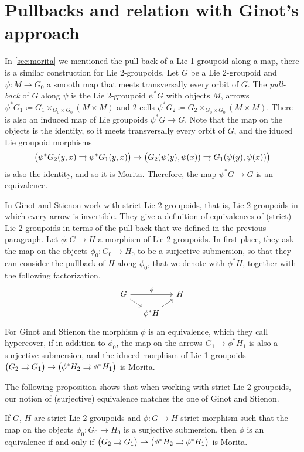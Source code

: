 %
%

\section{Pullbacks and relation with Ginot's approach}

In \textsection \ref{sec:morita} we mentioned the pull-back of a Lie 1-groupoid along a map, there is a similar construction for Lie 2-groupoids.
Let $G$ be a Lie 2-groupoid and $\psi\colon M\to G_0$ a smooth map that meets transversally every orbit of $G$.
The \emph{pull-back} of $G$ along $\psi$ is the Lie 2-groupoid $\psi^*G$ with objects $M$, arrows $\psi^*G_1 \coloneqq G_1\times_{G_0\times G_0}(M\times M)$ and 2-cells $\psi^*G_2 \coloneqq G_2\times_{G_0\times G_0}(M\times M)$.
There is also an induced map of Lie groupoids $\psi^*G\to G$.
Note that the map on the objects is the identity, so it meets transversally every orbit of $G$, and the iduced Lie groupoid morphisms
\[ \big( \psi^*G_2(y,x) \rightrightarrows \psi^*G_1(y,x) \big) \to \big( G_2(\psi(y),\psi(x)) \rightrightarrows G_1(\psi(y),\psi(x)) \big) \]
is also the identity, and so it is Morita.
Therefore, the map $\psi^*G\to G$ is an equivalence.

In \cite{gs15} Ginot and Stienon work with strict Lie 2-groupoids, that is, Lie 2-groupoids in which every arrow is invertible.
They give a definition of equivalences of (strict) Lie 2-groupoids in terms of the pull-back that we defined in the previous paragraph.
Let $\phi\colon G\to H$ a morphism of Lie 2-groupoids.
In first place, they ask the map on the objects $\phi_0\colon G_0\to H_0$ to be a surjective submersion, so that they can consider the pullback of $H$ along $\phi_0$, that we denote with $\phi^*H$, together with the following factorization.
\begin{equation}
\begin{tikzcd}[sep = small]
  G \ar{rr}{\phi} \ar{dr} &   & H \\
  & \phi^*H \ar{ur}
\end{tikzcd}
\end{equation}
For Ginot and Stienon the morphism $\phi$ is an equivalence, which they call hypercover, if in addition to $\phi_0$, the map on the arrows $G_1\to \phi^*H_1$ is also a surjective submersion, and the iduced morphism of Lie 1-groupoids $\big(G_2\rightrightarrows G_1\big)\to \big(\phi^*H_2\rightrightarrows \phi^*H_1\big)$ is Morita.

The following proposition shows that when working with strict Lie 2-groupoids, our notion of (surjective) equivalence matches the one of Ginot and Stienon.

\begin{prop}
If $G$, $H$ are strict Lie 2-groupoids and $\phi\colon G\to H$ strict morphism such that the map on the objects $\phi_0\colon G_0\to H_0$ is a surjective submersion, then $\phi$ is an equivalence if and only if $\big( G_2\rightrightarrows G_1 \big) \to \big( \phi^*H_2\rightrightarrows \phi^*H_1 \big)$ is Morita.
\end{prop}
